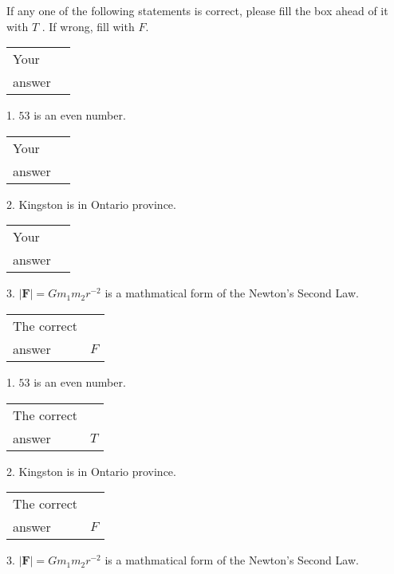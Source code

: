 \documentclass[12pt]{article}
\begin{document}
  
If any one of the following statements is correct, please fill the box ahead of it with $T$ .
If wrong, fill with $F$.
 
\noindent\begin{tabular}{|l|l|}\hline Your&\hspace{.2in} \\ answer&\hspace{.2in} \\ \hline \end{tabular}
1. $ %
53$ is an  %
even number.
 
\noindent\begin{tabular}{|l|l|}\hline Your&\hspace{.2in} \\ answer&\hspace{.2in} \\ \hline \end{tabular}
2.  %
Kingston is in  %
Ontario province.
 
\noindent\begin{tabular}{|l|l|}\hline Your&\hspace{.2in} \\ answer&\hspace{.2in} \\ \hline \end{tabular}
3.  %
$\left| \mathbf{F}\right| =Gm_1m_2r^{-2}$ is a mathmatical form of
the Newton's Second Law.
 
 
 
\noindent{}
 
 

 
\noindent\begin{tabular}{|l|l|}\hline The correct & \\
          answer &  %
$F$ \\ \hline \end{tabular}
1. $ %
53$ is an  %
even number.
 
\noindent\begin{tabular}{|l|l|}\hline The correct & \\
          answer &  %
$T$ \\ \hline \end{tabular}
2.  %
Kingston is in  %
Ontario province.
 
\noindent\begin{tabular}{|l|l|}\hline The correct & \\
          answer &  %
$F$ \\ \hline \end{tabular}
3.  %
$\left| \mathbf{F}\right| =Gm_1m_2r^{-2}$ is a mathmatical form of  %
the Newton's Second Law.
 
\end{document}
